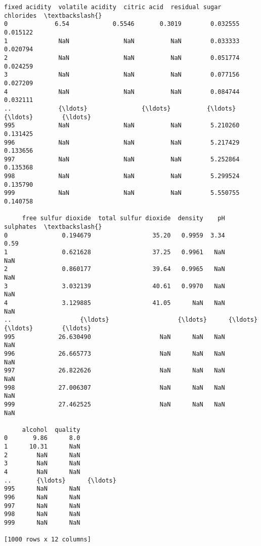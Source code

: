 \documentclass[11pt]{article}
\makeatletter
\newcommand{\boxspacing}{\kern\kvtcb@left@rule\kern\kvtcb@boxsep}
\newcommand{\prompt}[4]{
        {\ttfamily\llap{{\color{#2}[#3]:\hspace{3pt}#4}}\vspace{-\baselineskip}}
    }
\makeatother
\begin{document}
            \begin{tcolorbox}[breakable, size=fbox, boxrule=.5pt, pad at break*=1mm, opacityfill=0]
\prompt{Out}{outcolor}{13}{\boxspacing}
\begin{Verbatim}[commandchars=\\\{\}]
     fixed acidity  volatile acidity  citric acid  residual sugar  chlorides  \textbackslash{}
0             6.54            0.5546       0.3019        0.032555   0.015122
1              NaN               NaN          NaN        0.033333   0.020794
2              NaN               NaN          NaN        0.051774   0.024259
3              NaN               NaN          NaN        0.077156   0.027209
4              NaN               NaN          NaN        0.084744   0.032111
..             {\ldots}               {\ldots}          {\ldots}             {\ldots}        {\ldots}
995            NaN               NaN          NaN        5.210260   0.131425
996            NaN               NaN          NaN        5.217429   0.133656
997            NaN               NaN          NaN        5.252864   0.135368
998            NaN               NaN          NaN        5.299524   0.135790
999            NaN               NaN          NaN        5.550755   0.140758

     free sulfur dioxide  total sulfur dioxide  density    pH  sulphates  \textbackslash{}
0               0.194679                 35.20   0.9959  3.34       0.59
1               0.621628                 37.25   0.9961   NaN        NaN
2               0.860177                 39.64   0.9965   NaN        NaN
3               3.032139                 40.61   0.9970   NaN        NaN
4               3.129885                 41.05      NaN   NaN        NaN
..                   {\ldots}                   {\ldots}      {\ldots}   {\ldots}        {\ldots}
995            26.630490                   NaN      NaN   NaN        NaN
996            26.665773                   NaN      NaN   NaN        NaN
997            26.822626                   NaN      NaN   NaN        NaN
998            27.006307                   NaN      NaN   NaN        NaN
999            27.462525                   NaN      NaN   NaN        NaN

     alcohol  quality
0       9.86      8.0
1      10.31      NaN
2        NaN      NaN
3        NaN      NaN
4        NaN      NaN
..       {\ldots}      {\ldots}
995      NaN      NaN
996      NaN      NaN
997      NaN      NaN
998      NaN      NaN
999      NaN      NaN

[1000 rows x 12 columns]
\end{Verbatim}
\end{tcolorbox}
        
\end{document}
